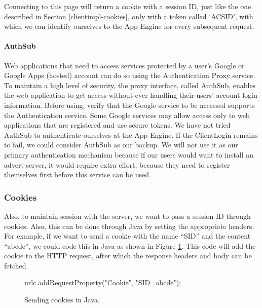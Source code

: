 Connecting to this page will return a cookie with a session ID, just like the
one described in Section \ref{clientimpl-cookies}, only with a token called
`ACSID', with which we can identify ourselves to the App Engine for every
subsequent request.

\paragraph{AuthSub}
Web applications that need to access services protected by a user's Google or
Google Apps (hosted) account can do so using the Authentication Proxy service. To
maintain a high level of security, the proxy interface, called AuthSub, enables
the web application to get access without ever handling their users' account
login information. Before using, verify that the Google service to be accessed
supports the Authentication service. Some Google services may allow access only
to web applications that are registered and use secure tokens. We have not tried
AuthSub to authenticate ourselves at the App Engine. If the ClientLogin remains
to fail, we could consider AuthSub as our backup. We will not use it as our
primary authentication mechanism because if our users would want to install an
advert server, it would require extra effort, because they need to register
themselves first before this service can be used.

\subsubsection{Cookies}
Also, to maintain session with the server, we want to pass a session ID through
cookies. Also, this can be done through Java by setting the appropriate headers.
For example, if we want to send a cookie with the name ``SID'' and the content
``abcde'', we could code this in Java as shown in Figure
\ref{clientimpl-cookies-req}. This code will add the cookie to the HTTP request,
after which the response headers and body can be fetched.

\begin{figure}[ht] %
\begin{center}
\begin{code}
urlc.addRequestProperty("Cookie", "SID=abcde");
\end{code}
\caption{Sending cookies in Java.\label{clientimpl-cookies-req}}
\end{center}
\end{figure}

